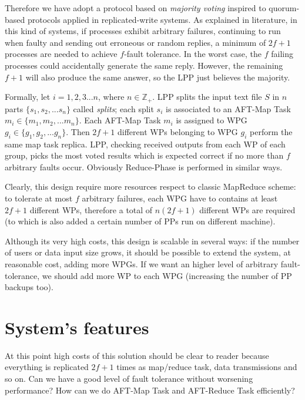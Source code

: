 \documentclass[sigchi]{acmart}
\begin{document}
Therefore we have adopt a protocol based on \textit{majority voting} inspired to quorum-based protocols applied in replicated-write systems. As explained in literature\citep{SDCC}, in this kind of systems, if processes exhibit arbitrary failures, continuing to run when faulty and sending out erroneous or random replies, a minimum of $2f+1$ processes are needed to achieve $f$-fault tolerance. In the worst case, the $f$ failing processes could accidentally generate the same reply. However, the remaining $f+1$ will also produce the same answer, so the LPP just believes the majority.

Formally, let $i = 1,2,3...n$, where $n \in \mathbb{Z}_+$. LPP splits the input text file $S$ in $n$ parts $\lbrace s_1, s_2, ... s_n \rbrace$ called \textit{splits}; each split $s_i$ is associated to an AFT-Map Task $m_i \in \lbrace m_1, m_2, ... m_n \rbrace$. Each AFT-Map Task $m_i$ is assigned to WPG $g_i \in \lbrace g_1, g_2, ... g_n \rbrace$. Then $2f+1$ different WPs belonging to WPG $g_i$ perform the same map task replica. LPP, checking received outputs from each WP of each group, picks the most voted results which is expected correct if no more than $f$ arbitrary faults occur. Obviously Reduce-Phase is performed in similar ways.

Clearly, this design require more resources respect to classic MapReduce scheme: to tolerate at most $f$ arbitrary failures, each WPG have to contains at least $2f+1$ different WPs, therefore a total of $n(2f+1)$ different WPs are required (to which is also added a certain number of PPs run on different machine).

Although its very high costs, this design is scalable in several ways: if the number of users or data input size grows, it should be possible to extend the system, at reasonable cost, adding more WPGs. If we want an higher level of arbitrary fault-tolerance, we should add more WP to each WPG (increasing the number of PP backups too).

\section{System's features}

At this point high costs of this solution should be clear to reader because everything is replicated $2f + 1$ times as map/reduce task, data transmissions and so on. Can we have a good level of fault tolerance without worsening performance? How can we do AFT-Map Task and AFT-Reduce Task efficiently? 
\end{document}
